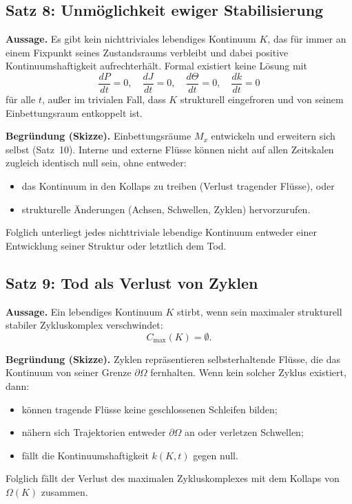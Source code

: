 \subsection{Satz 8: Unmöglichkeit ewiger Stabilisierung}
\label{thm:no-eternal-stabilisation}

\textbf{Aussage.}
Es gibt kein nichttriviales lebendiges Kontinuum \(K\), das für immer an einem Fixpunkt seines Zustandsraums verbleibt und dabei positive Kontinuumshaftigkeit aufrechterhält.
Formal existiert keine Lösung mit
\[
    \frac{dP}{dt} = 0, \quad \frac{dJ}{dt} = 0, \quad \frac{d\Theta}{dt} = 0, \quad \frac{dk}{dt} = 0
\]
für alle \(t\), außer im trivialen Fall, dass \(K\) strukturell eingefroren und von seinem Einbettungsraum entkoppelt ist.

\textbf{Begründung (Skizze).}
Einbettungsräume \(M_x\) entwickeln und erweitern sich selbst (Satz~10).
Interne und externe Flüsse können nicht auf allen Zeitskalen zugleich identisch null sein, ohne entweder:
\begin{itemize}
    \item das Kontinuum in den Kollaps zu treiben (Verlust tragender Flüsse), oder
    \item strukturelle Änderungen (Achsen, Schwellen, Zyklen) hervorzurufen.
\end{itemize}
Folglich unterliegt jedes nichttriviale lebendige Kontinuum entweder einer Entwicklung seiner Struktur oder letztlich dem Tod.

\subsection{Satz 9: Tod als Verlust von Zyklen}

\textbf{Aussage.}
Ein lebendiges Kontinuum \(K\) stirbt, wenn sein maximaler strukturell stabiler Zykluskomplex verschwindet:
\[
    C_{\max}(K) = \emptyset.
\]

\textbf{Begründung (Skizze).}
Zyklen repräsentieren selbsterhaltende Flüsse, die das Kontinuum von seiner Grenze \(\partial\Omega\) fernhalten.
Wenn kein solcher Zyklus existiert, dann:
\begin{itemize}
    \item können tragende Flüsse keine geschlossenen Schleifen bilden;
    \item nähern sich Trajektorien entweder \(\partial\Omega\) an oder verletzen Schwellen;
    \item fällt die Kontinuumshaftigkeit \(k(K,t)\) gegen null.
\end{itemize}
Folglich fällt der Verlust des maximalen Zykluskomplexes mit dem Kollaps von \(\Omega(K)\) zusammen.

